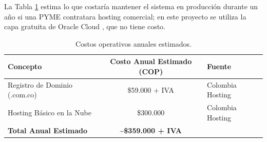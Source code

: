 La Tabla \ref{tab:costo_operativo} estima lo que costaría mantener el sistema en producción durante un año si una PYME contratara hosting comercial; en este proyecto se utiliza la capa gratuita de Oracle Cloud \cite{oci_always_free}, que no tiene costo.

\begin{table}[!htbp]
\centering
\caption{Costos operativos anuales estimados.}
\label{tab:costo_operativo}
\begin{tabular}{|l|c|l|}
\hline
\textbf{Concepto} & \textbf{Costo Anual Estimado (COP)} & \textbf{Fuente} \\ \hline
Registro de Dominio (.com.co) & \$59.000 + IVA & Colombia Hosting \cite{colhost_dominios} \\ 
Hosting Básico en la Nube & \$300.000 & Colombia Hosting \cite{colhost_hosting} \\ \hline
\textbf{Total Anual Estimado} & \textbf{\textasciitilde\$359.000 + IVA} & \\ \hline
\end{tabular}
\end{table}


